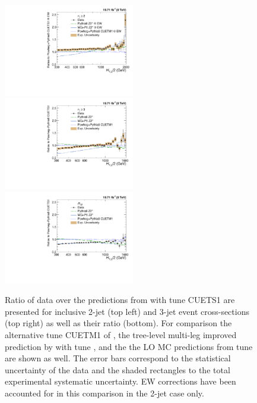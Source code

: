 \begin{figure}[!h]
 \begin{center}
 \hspace*{-5mm}\includegraphics[width=0.51\textwidth]{Plots_HT_2_150/Comparison_data_MC_samples_2_Pow_EW.pdf}%
 ~~\includegraphics[width=0.51\textwidth]{Plots_HT_2_150/Comparison_data_MC_samples_3_Pow.pdf}\\
 \includegraphics[width=0.51\textwidth]{Plots_HT_2_150/Comparison_data_MC_samples_ratio_32_Pow.pdf}\\
 \caption[Ratio of data over the predictions from Monte Carlo simulations.]{Ratio of data over the predictions from \POWHEGn \plusn \PYTHIAE with tune CUETS1 are presented for inclusive 2-jet (top left) and 3-jet event cross-sections (top right) as well as their ratio \ratio (bottom). For comparison the alternative tune CUETM1 of \POWHEGn \plusn \PYTHIAE, the tree-level multi-leg improved prediction by \MadGraphFn \plusn \PYTHIAS with tune \Ztwostar, and the the LO MC predictions from \PYTHIAS tune \Ztwostar are shown as well. The error bars correspond to the statistical uncertainty of the data and the shaded rectangles to the total experimental systematic uncertainty. EW corrections have been accounted for in this comparison in the 2-jet case only.}
 \label{fig:data_MC}
 \end{center}
\end{figure}

